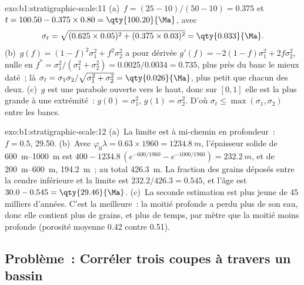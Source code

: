 \begin{solution}{exo:b1:stratigraphic-scale:11}
(a)~$f = (25 - 10)/(50 - 10) = 0.375$ et $t = 100.50 - 0.375 \times 0.80 =
\qty{100.20}{\Ma}$, avec
\[
  \sigma_t = \sqrt{(0.625 \times 0.05)^2 + (0.375 \times 0.03)^2} = \qty{0.033}{\Ma}.
\] (b)~$g(f) = (1 - f)^2\sigma_1^2 + f^2\sigma_2^2$
a pour dérivée $g'(f) = -2(1 - f)\sigma_1^2 + 2f\sigma_2^2$, nulle en $f^* =
\sigma_1^2/(\sigma_1^2 + \sigma_2^2) = 0.0025/0.0034 = 0.735$, plus près du banc le mieux
daté~; là $\sigma_t = \sigma_1\sigma_2/\sqrt{\sigma_1^2 + \sigma_2^2} =
\qty{0.026}{\Ma}$, plus petit que chacun des deux. (c)~$g$ est une parabole ouverte vers le haut, donc
sur $[0, 1]$ elle est la plus grande à une extrémité~: $g(0) = \sigma_1^2$, $g(1) = \sigma_2^2$.
D'où $\sigma_t \le \max(\sigma_1, \sigma_2)$ entre les bancs.
\end{solution}

\begin{solution}{exo:b1:stratigraphic-scale:12}
(a)~La limite est à mi-chemin en profondeur~: $f = 0.5$, \qty{29.50}{\Ma}. (b)~Avec
$\varphi_0\lambda = 0.63 \times 1960 = \qty{1234.8}{m}$, l'épaisseur solide de
\qtyrange{600}{1000}{m} est $400 - 1234.8\,(e^{-600/1960} - e^{-1000/1960}) =
\qty{232.2}{m}$, et de \qtyrange{200}{600}{m}, \qty{194.2}{m}~; au total
\qty{426.3}{m}. La fraction des grains déposés entre la cendre inférieure et la
limite est $232.2/426.3 = 0.545$, et l'âge est $30.0 - 0.545 =
\qty{29.46}{\Ma}$. (c)~La seconde estimation est plus jeune de \num{45} milliers d'années.
C'est la meilleure~: la moitié profonde a perdu plus de son eau, donc elle contient
plus de grains, et plus de temps, par mètre que la moitié moins profonde (porosité moyenne
\num{0.42} contre \num{0.51}).
\end{solution}

\subsection*{Problème~: Corréler trois coupes à travers un bassin}


